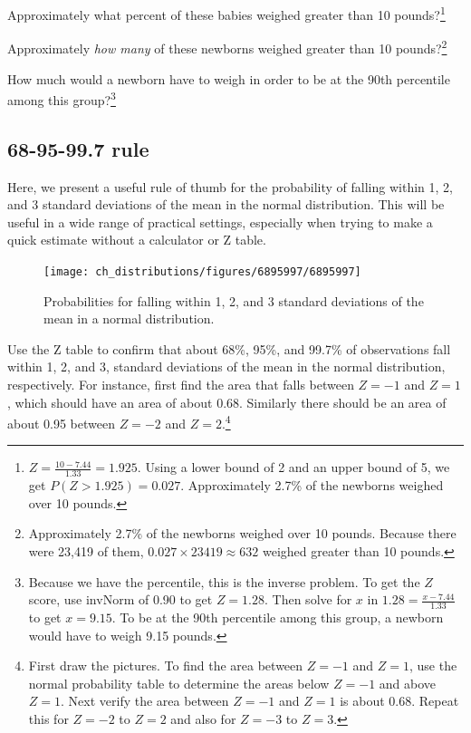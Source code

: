 \begin{exercise}Approximately what percent of these babies weighed greater than 10 pounds?\footnote{$Z=\frac{10-7.44}{1.33}=1.925$. Using a lower bound of 2 and an upper bound of 5, we get $P(Z > 1.925) = 0.027$. Approximately 2.7\% of the newborns weighed over 10 pounds.}
\end{exercise}

\begin{exercise}Approximately \emph{how many} of these newborns weighed greater than 10 pounds?\footnote{Approximately 2.7\% of the newborns weighed over 10 pounds. Because there were 23,419 of them, $0.027 \times 23419 \approx 632$ weighed greater than 10 pounds.}
\end{exercise}

\begin{exercise}How much would a newborn have to weigh in order to be at the 90th percentile among this group?\footnote{Because we have the percentile, this is the inverse problem. To get the $Z$ score, use invNorm of 0.90 to get $Z =  1.28$. Then solve for $x$ in $1.28=\frac{x - 7.44}{1.33}$ to get $x = 9.15$. To be at the 90th percentile among this group, a newborn would have to weigh 9.15 pounds.}
\end{exercise}


\subsection{68-95-99.7 rule}

Here, we present a useful rule of thumb for the probability of falling within 1, 2, and 3 standard deviations of the mean in the normal distribution. This will be useful in a wide range of practical settings, especially when trying to make a quick estimate without a calculator or Z table.

\begin{figure}[hht]
\centering
\texttt{[image: ch\_distributions/figures/6895997/6895997]}
\caption{Probabilities for falling within 1, 2, and 3 standard deviations of the mean in a normal distribution.}
\label{6895997}
\end{figure}

\begin{exercise}
Use the Z table to confirm that about 68\%, 95\%, and 99.7\% of observations fall within 1, 2, and 3, standard deviations of the mean in the normal distribution, respectively. For instance, first find the area that falls between $Z=-1$ and $Z=1$, which should have an area of about 0.68. Similarly there should be an area of about 0.95 between $Z=-2$ and $Z=2$.\footnote{First draw the pictures. To find the area between $Z=-1$ and $Z=1$, use the normal probability table to determine the areas below $Z=-1$ and above $Z=1$. Next verify the area between $Z=-1$ and $Z=1$ is about 0.68. Repeat this for $Z=-2$ to $Z=2$ and also for $Z=-3$ to $Z=3$.}
\end{exercise}

